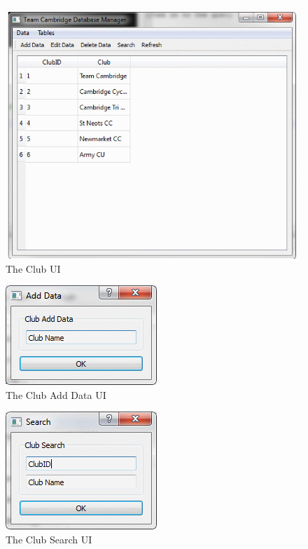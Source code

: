\begin{figure}[H]
\includegraphics{./Maintenance/UI/Club.png}
\caption{The Club UI} \label{fig:club_UI}
\end{figure}

\begin{figure}[H]
\includegraphics{./Maintenance/UI/ClubAD.png}
\caption{The Club Add Data UI} \label{fig:ClubAD_UI}
\end{figure}

\begin{figure}[H]
\includegraphics{./Maintenance/UI/ClubSearch.png}
\caption{The Club Search UI} \label{fig:ClubSearch_UI}
\end{figure}



